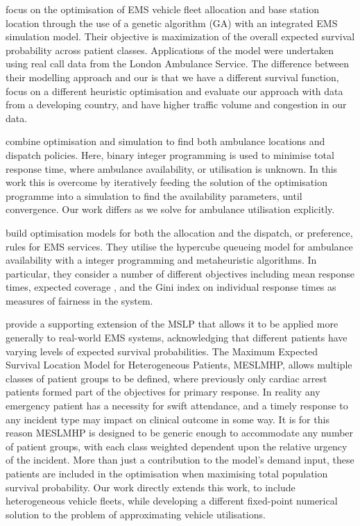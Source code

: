 \documentclass[numbers,webpdf,imaman]{ima-authoring-template}%
\begin{document}
\citet{MCormack2015} focus on the optimisation of
EMS vehicle fleet allocation and base station location through the use of a
genetic algorithm (GA) with an integrated EMS simulation model. Their
objective is maximization of the overall expected survival probability across
patient classes. Applications of the model were undertaken using real call
data from the London Ambulance Service. The difference between their modelling
approach and our is that we have a different survival function, focus on a
different heuristic optimisation and evaluate our approach with data from a
developing country, and have higher traffic volume and congestion in our data.

\citet{belanger20} combine optimisation and simulation to find
both ambulance locations and dispatch policies. Here, binary integer programming 
is used to minimise total response time, where ambulance availability, or
utilisation is unknown. In this work this is overcome by iteratively feeding the
solution of the optimisation programme into a simulation to find the
availability parameters, until convergence. Our work differs as we solve for
ambulance utilisation explicitly.

\citet{torodiaz13, torodiaz15} build
optimisation models for both the allocation and the dispatch, or preference,
rules for EMS services. They utilise the hypercube queueing model for ambulance
availability with a integer programming and metaheuristic algorithms. In
particular, they consider a number of different objectives including mean
response times, expected coverage \citep{daskin83}, and the Gini index on
individual response times as measures of fairness in the system.

\citet{Knight2012918} provide a supporting extension
of the MSLP that allows it to be applied more generally to real-world EMS
systems, acknowledging that different patients have varying levels of expected
survival probabilities.  The Maximum Expected Survival Location Model for
Heterogeneous Patients, MESLMHP, allows multiple classes of patient groups to
be defined, where previously only cardiac arrest patients formed part of the
objectives for primary response. In reality any emergency
patient has a necessity for swift attendance, and a timely response to any
incident type may impact on clinical outcome in some way. It is for this
reason MESLMHP is designed to be generic enough to accommodate any number of
patient groups, with each class weighted dependent upon the relative urgency
of the incident.  More than just a contribution to the model’s demand input,
these patients are included in the optimisation when maximising total
population survival probability.
Our work directly extends this work, to include heterogeneous vehicle fleets,
while developing a different fixed-point numerical solution to the problem of
approximating vehicle utilisations.
\end{document}
